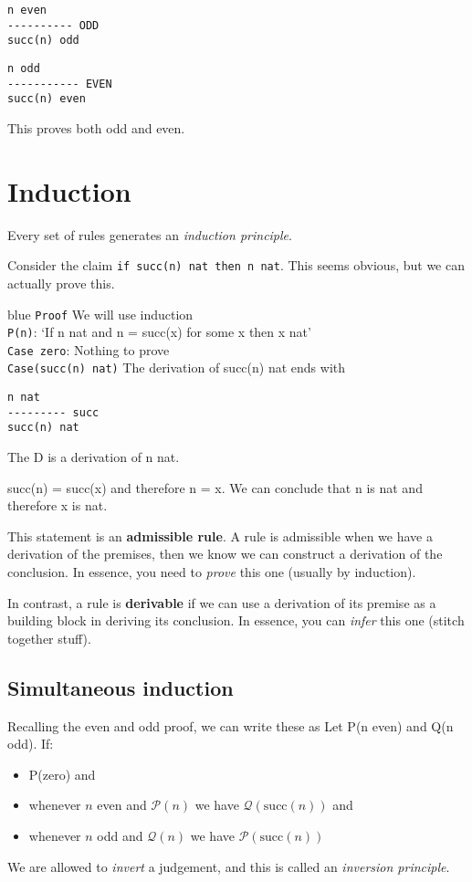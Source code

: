 \documentclass[11pt,a4paper,titlepage,dvipsnames,cmyk]{scrartcl}
\begin{document}
\begin{lstlisting}
n even
---------- ODD
succ(n) odd
\end{lstlisting}

\begin{lstlisting}
n odd
----------- EVEN
succ(n) even
\end{lstlisting}

This proves both odd and even.

\section{Induction}
Every set of rules generates an \textit{induction principle}. 

Consider the claim \lstinline|if succ(n) nat then n nat|. This seems obvious, but we can actually prove this.

\begin{blue}{blue}
\texttt{Proof} We will use induction \\
\texttt{P(n)}: `If n nat and n = succ(x) for some x then x nat' \\
\texttt{Case zero}: Nothing to prove \\
\texttt{Case(succ(n) nat)} The derivation of succ(n) nat ends with
\begin{lstlisting}
n nat
--------- succ
succ(n) nat
\end{lstlisting}
The D is a derivation of n nat.

succ(n) = succ(x) and therefore n = x. We can conclude that n is nat and therefore x is nat.
\end{blue}

This statement is an \textbf{admissible rule}. A rule is admissible when we have a derivation of the premises, then we know we can construct a derivation of the conclusion. In essence, you need to \textit{prove} this one (usually by induction).

In contrast, a rule is \textbf{derivable} if we can use a derivation of its premise as a building block in deriving its conclusion. In essence, you can \textit{infer} this one (stitch together stuff).

\subsection{Simultaneous induction}
Recalling the even and odd proof, we can write these as Let P(n even) and Q(n odd). If:
\begin{itemize}
    \item P(zero) and
    \item whenever $n$ even and $\mathcal{P}(n)$ we have $\mathcal{Q}(\text{succ}(n))$ and
    \item whenever $n$ odd and $\mathcal{Q}(n)$ we have $\mathcal{P}(\text{succ}(n))$
\end{itemize}

We are allowed to \textit{invert} a judgement, and this is called an \textit{inversion principle}.
\end{document}
